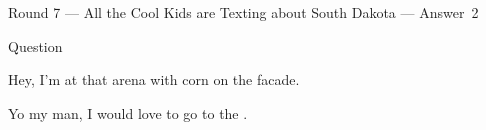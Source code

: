 \documentclass[11pt]{beamer}
\begin{document}
\begin{frame}[t]{Round 7 --- All the Cool Kids are Texting about South Dakota --- \mbox{Answer 2}}
\begin{block}{Question}

\begin{minipage}{0.9\textwidth}
\begin{mdframed}[
    roundcorner=7pt,
    backgroundcolor=black!5,
    linecolor=black!5,
    fontcolor=black,
    ignorelastdescenders]
\begin{flushleft}
{\small{}\selectfont{}
Hey, I'm at that arena with corn on the facade.
}
\end{flushleft}
\end{mdframed}
\end{minipage}

\hfill{}\begin{minipage}{0.9\textwidth}
\begin{mdframed}[
    roundcorner=7pt,
    backgroundcolor=blue!80!white,
    linecolor=blue!80!white,
    fontcolor=white,
    ignorelastdescenders]
\begin{flushleft}
{\small{}\selectfont{}
Yo my man, I would love to go to the \textunderscore{}\textunderscore{}\textunderscore{}\textunderscore{}\textunderscore{}\textunderscore{} \textunderscore{}\textunderscore{}\textunderscore{}\textunderscore{}\textunderscore{}\textunderscore{} \textunderscore{}\textunderscore{}\textunderscore{}\textunderscore{}\textunderscore{}\textunderscore{}.
}
\end{flushleft}
\end{mdframed}
\end{minipage}
\end{block}
\end{frame}
\end{document}
